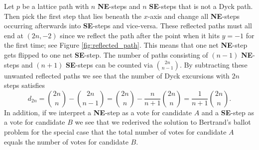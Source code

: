 \begin{example}
  Let $p$ be a lattice path with $n$ \textbf{NE}-steps and $n$ \textbf{SE}-steps that is not a Dyck path. Then pick the first step that lies beneath the $x$-axis and change all \textbf{NE}-steps occurring afterwards into \textbf{SE}-steps and vice-versa. 
  These reflected paths must all end at $(2n,-2)$ since we reflect the path after the point when it hits $y = -1$ for the first time; see Figure \ref{fig:reflected_path}. This means that one net \textbf{NE}-step gets flipped to one net \textbf{SE}-step. The number of paths consisting of $(n-1)$ \textbf{NE}-steps and $(n+1)$ \textbf{SE}-steps can be counted via $\binom{2n}{n-1}.$ By subtracting these unwanted reflected paths we see that the number of Dyck excursions with $2n$ steps satisfies
  $$
  d_{2n} = \binom{2n}{n} - \binom{2n}{n-1} = \binom{2n}{n} - \frac{n}{n+1}\binom{2n}{n} = \frac{1}{n+1}\binom{2n}{n}.
  $$
  In addition, if we interpret a \textbf{NE}-step as a vote for candidate $A$ and a \textbf{SE}-step as a vote for candidate $B$ we see that we rederived the solution to Bertrand's ballot problem for the special case that the total number of votes for candidate $A$ equals the number of votes for candidate $B$.
\end{example}

